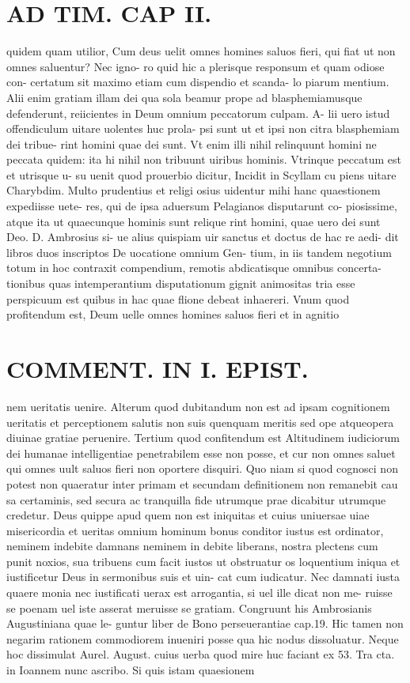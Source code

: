 \documentclass{article}
\begin{document}
\begin{pages}
\section*{AD TIM. CAP II. }
\marginpar{[ p.113 ]}\pstart quidem quam utilior, Cum deus uelit omnes homines saluos fieri, qui fiat ut non omnes saluentur? Nec igno- ro quid hic a plerisque responsum et quam odiose con- certatum sit maximo etiam cum dispendio et scanda- lo piarum mentium. Alii enim gratiam illam dei qua sola beamur prope ad blasphemiamusque defenderunt, reiicientes in Deum omnium peccatorum culpam. A- lii uero istud offendiculum uitare uolentes huc prola- psi sunt ut et ipsi non citra blasphemiam dei tribue- rint homini quae dei sunt. Vt enim illi nihil relinquunt homini ne peccata quidem: ita hi nihil non tribuunt uiribus hominis. Vtrinque peccatum est et utrisque u- su uenit quod prouerbio dicitur, Incidit in Scyllam cu piens uitare Charybdim. Multo prudentius et religi osius uidentur mihi hanc quaestionem expediisse uete- res, qui de ipsa aduersum Pelagianos disputarunt co- piosissime, atque ita ut quaecunque hominis sunt relique rint homini, quae uero dei sunt Deo. D. Ambrosius si- ue alius quispiam uir sanctus et doctus de hac re aedi- dit libros duos inscriptos De uocatione omnium Gen- tium, in iis tandem negotium totum in hoc contraxit compendium, remotis abdicatisque omnibus concerta- tionibus quas intemperantium disputationum gignit animositas tria esse perspicuum est quibus in hac quae flione debeat inhaereri. Vnum quod profitendum est, Deum uelle omnes homines saluos fieri et in agnitio  \pend
\section*{COMMENT. IN I. EPIST. }\pstart nem ueritatis uenire. Alterum quod dubitandum non est ad ipsam cognitionem ueritatis et perceptionem salutis non suis quenquam meritis sed ope atqueopera diuinae gratiae peruenire. Tertium quod confitendum est Altitudinem iudiciorum dei humanae intelligentiae penetrabilem esse non posse, et cur non omnes saluet qui omnes uult saluos fieri non oportere disquiri. Quo niam si quod cognosci non potest non quaeratur inter primam et secundam definitionem non remanebit cau sa certaminis, sed secura ac tranquilla fide utrumque prae dicabitur utrumque credetur. Deus quippe apud quem non est iniquitas et cuius uniuersae uiae misericordia et ueritas omnium hominum bonus conditor iustus est ordinator, neminem indebite damnans neminem in debite liberans, nostra plectens cum punit noxios, sua tribuens cum facit iustos ut obstruatur os loquentium iniqua et iustificetur Deus in sermonibus suis et uin- cat cum iudicatur. Nec damnati iusta quaere monia nec iustificati uerax est arrogantia, si uel ille dicat non me- ruisse se poenam uel iste asserat meruisse se gratiam. Congruunt his Ambrosianis Augustiniana quae le- guntur liber  de Bono perseuerantiae cap.19. Hic tamen non negarim rationem commodiorem inueniri posse qua hic nodus dissoluatur. Neque hoc dissimulat Aurel. August. cuius uerba quod mire huc faciant ex 53. Tra cta. in Ioannem nunc ascribo. Si quis istam quaesionem  \pend

\end{pages}
\end{document}
